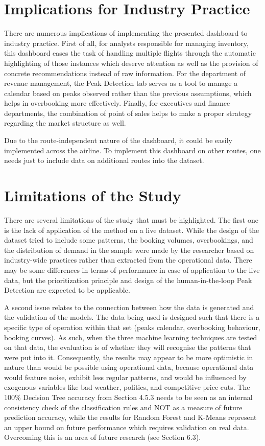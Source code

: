 \section{Implications for Industry Practice}

There are numerous implications of implementing the presented dashboard to industry practice. First of all, for analysts responsible for managing inventory, this dashboard eases the task of handling multiple flights through the automatic highlighting of those instances which deserve attention as well as the provision of concrete recommendations instead of raw information. For the department of revenue management, the Peak Detection tab serves as a tool to manage a calendar based on peaks observed rather than the previous assumptions, which helps in overbooking more effectively. Finally, for executives and finance departments, the combination of point of sales helps to make a proper strategy regarding the market structure as well.

Due to the route-independent nature of the dashboard, it could be easily implemented across the airline. To implement this dashboard on other routes, one needs just to include data on additional routes into the dataset.

\section{Limitations of the Study}

There are several limitations of the study that must be highlighted. The first one is the lack of application of the method on a live dataset. While the design of the dataset tried to include some patterns, the booking volumes, overbookings, and the distribution of demand in the sample were made by the researcher based on industry-wide practices rather than extracted from the operational data. There may be some differences in terms of performance in case of application to the live data, but the prioritization principle and design of the human-in-the-loop Peak Detection are expected to be applicable.

A second issue relates to the connection between how the data is generated and the validation of the models. The data being used is designed such that there is a specific type of operation within that set (peaks calendar, overbooking behaviour, booking curves). As such, when the three machine learning techniques are tested on that data, the evaluation is of whether they will recognise the patterns that were put into it. Consequently, the results may appear to be more optimistic in nature than would be possible using operational data, because operational data would feature noise, exhibit less regular patterns, and would be influenced by exogenous variables like bad weather, politics, and competitive price cuts. The 100\% Decision Tree accuracy from Section 4.5.3 needs to be seen as an internal consistency check of the classification rules and NOT as a measure of future prediction accuracy, while the results for Random Forest and K-Means represent an upper bound on future performance which requires validation on real data. Overcoming this is an area of future research (see Section 6.3).

